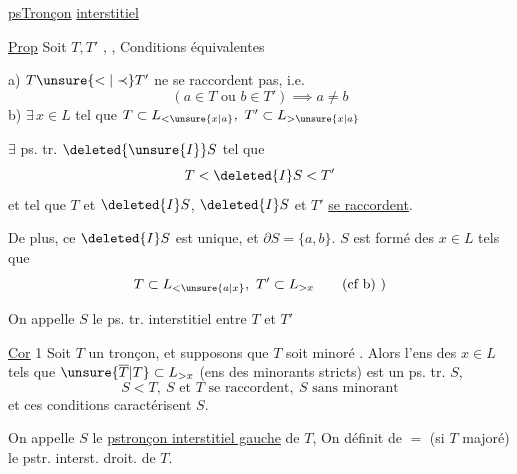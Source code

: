 \uline{psTronçon} \uline{interstitiel}

\uline{Prop} Soit $T,T'$ , , Conditions équivalentes  

a) $T\unsure{<|\prec}T'$  ne se raccordent pas, i.e.
\[
(a\in T\text{ ou }b\in T')\implies a\neq b
\]
\quad b) $\exists\,x\in L$ tel que $T\subset L_{<\unsure{x|a}},\ T'\subset L_{>\unsure{x|a}}$

 $\exists$ ps. tr. $\deleted{\unsure{I}}S$ tel que
\[
T<\deleted{I}S<T'
\]
et tel que $T$ et $\deleted{I}S$, $\deleted{I}S$ et $T'$ \uline{se raccordent}.

De plus, ce $\deleted{I}S$ est unique, et $\partial S=\{a,b\}$. $S$ est formé des $x\in L$ tels que
\[
T\subset L_{<\unsure{a|x}},\ T'\subset L_{>x}\qquad\text{(cf b) )}
\]

On appelle $S$ le ps. tr. interstitiel entre $T$ et $T'$

\uline{Cor} 1 Soit $T$ un tronçon, et supposons que $T$ soit minoré . Alors l'ens des   $x\in L$ tels que $\unsure{\overline T|T}\subset L_{>x}$ (ens des minorants stricts) est un  ps. tr. $S$,  
\begingroup
\makeatletter
\tagsleft@true
\makeatother
\[
S<T,\ S\text{ et }T\text{ se raccordent},\ S\text{ sans minorant}\tag*{\(\ast\))}
\]
\endgroup
et ces conditions  caractérisent $S$.

 On appelle $S$ le \uline{pstronçon interstitiel gauche} de $T$, On définit de $=$ (si $T$ majoré) le pstr. interst. droit. de $T$.
